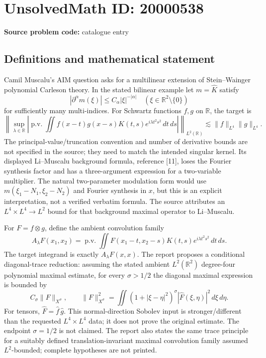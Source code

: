 \documentclass[11pt]{article}
\newcommand{\R}{\mathbb{R}}
\begin{document}
\section*{UnsolvedMath ID: 20000538}
\textbf{Source problem code:} catalogue entry
\subsection{Definitions and mathematical statement}
Camil Muscalu's AIM question asks for a multilinear extension of Stein--Wainger polynomial Carleson theory. In the stated bilinear example let \(m=\widehat K\) satisfy
\[
|\partial^\alpha m(\xi)|\leq C_\alpha|\xi|^{-|\alpha|}
\quad(\xi\in\R^2\setminus\{0\})
\]
for sufficiently many multi-indices. For Schwartz functions \(f,g\) on \(\R\), the target is
\[
\left\|\sup_{\lambda\in\R}\left|
\operatorname{p.v.}\iint f(x-t)g(x-s)K(t,s)e^{i\lambda t^2s^2}\,dt\,ds
\right|\right\|_{L^2(\R)}
\lesssim\|f\|_{L^4}\|g\|_{L^4}.
\]
The principal-value/truncation convention and number of derivative bounds are not specified in the source; they need to match the intended singular kernel. Its displayed Li--Muscalu background formula, reference [11], loses the Fourier synthesis factor and has a three-argument expression for a two-variable multiplier. The natural two-parameter modulation form would use \(m(\xi_1-N_1,\xi_2-N_2)\) and Fourier synthesis in \(x\), but this is an explicit interpretation, not a verified verbatim formula. The source attributes an \(L^4\times L^4\to L^2\) bound for that background maximal operator to Li--Muscalu.

For \(F=f\otimes g\), define the ambient convolution family
\[
A_\lambda F(x_1,x_2)=\operatorname{p.v.}\iint
F(x_1-t,x_2-s)K(t,s)e^{i\lambda t^2s^2}\,dt\,ds.
\]
The target integrand is exactly \(A_\lambda F(x,x)\). The report proposes a conditional diagonal-trace reduction: assuming the stated ambient \(L^2(\R^2)\) degree-four polynomial maximal estimate, for every \(\sigma>1/2\) the diagonal maximal expression is bounded by
\[
C_\sigma\|F\|_{X^\sigma},\qquad
\|F\|_{X^\sigma}^2=
\iint(1+|\xi-\eta|^2)^\sigma|\widehat F(\xi,\eta)|^2\,d\xi\,d\eta.
\]
For tensors, \(\widehat F=\widehat f\,\widehat g\). This normal-direction Sobolev input is stronger/different than the requested \(L^4\times L^4\) data; it does not prove the original estimate. The endpoint \(\sigma=1/2\) is not claimed. The report also states the same trace principle for a suitably defined translation-invariant maximal convolution family assumed \(L^2\)-bounded; complete hypotheses are not printed.
\end{document}
